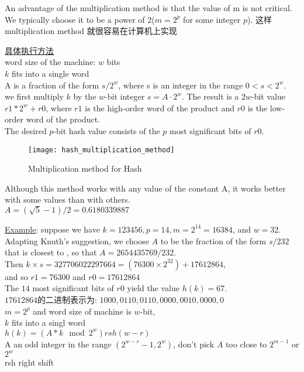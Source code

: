 \documentclass{article}
\begin{document}
An advantage of the multiplication method is that the value of m is not critical. We typically choose it to be a power of $2$($m=2^p$ for some integer $p$). 这样multiplication method 就很容易在计算机上实现

\underline{具体执行方法}\\
word size of the machine: $w$ bits\\
$k$ fits into a single word\\
A is a fraction of the form $s/2^w$, where s is an integer in the range $0 < s < 2^w$. \\
we first multiply $k$ by the $w$-bit integer $s = A \cdot 2^w$. The result is a $2w$-bit value $r1*2^w + r0$, where $r1$ is the high-order word of the product and $r0$ is the low-order word of the product. \\
The desired $p$-bit hash value consists of the $p$ most significant bits of $r0$.\\
\begin{figure}[htbp]
  \centering
  \texttt{[image: hash\_multiplication\_method]}\\
  \caption{Multiplication method for Hash}\label{fig.hash.mult}
\end{figure}

Although this method works with any value of the constant A, it works better with some values than with others.\\
$A=(\sqrt{5} - 1)/2=0.6180339887$

\underline{Example}: suppose we have $k = 123456, p = 14, m = 2^{14} = 16384$, and $w = 32$. Adapting Knuth's suggestion, we choose $A$ to be the fraction of the form $s/232$ that is closest to , so that $A = 2654435769/232$. \\
Then $k \times s = 327706022297664 = (76300 \times 2^{32}) + 17612864$, \\
and so $r1 = 76300$ and $r0 = 17612864$\\
The $14$ most significant bits of $r0$ yield the value $h(k) = 67$.\\
$17612864$的二进制表示为: $1000, 0110, 0110, 0000, 0010, 0000, 0$\\
$m=2^p$ and word size of machine is $w$-bit, \\
$k$ fits into a singl word\\
$h(k)=(A*k\mod 2^w) rsh (w-r)$\\
A an odd integer in the range $(2^{w-r}-1, 2^w)$, don't pick $A$ too close to $2^{m-1}$ or $2^w$\\
rsh right shift
\end{document}
